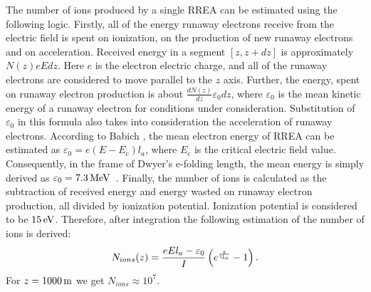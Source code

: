 \documentclass[doublecol,linenumbers]{epl2} %
\begin{document}
	The number of ions produced by a single RREA can be estimated using the following logic. Firstly, all of the energy runaway electrons receive from the electric field is spent on ionization, on the production of new runaway electrons and on acceleration. Received energy in a segment $[z, z + dz]$ is approximately $N(z) e E d z$. Here $e$ is the electron electric charge, and all of the runaway electrons are considered to move parallel to the $z$ axis. Further, the energy, spent on runaway electron production is about $\frac{d N(z)}{d z} \varepsilon_{0} d z$, where $\varepsilon_{0}$ is the mean kinetic energy of a runaway electron for conditions under consideration. Substitution of $\varepsilon_0$ in this formula also takes into consideration the acceleration of runaway electrons. According to Babich \cite{Babich2001}, the mean electron energy of RREA can be estimated as $\varepsilon_0 = e(E - E_c) l_a$, where $E_c$ is the critical electric field value. Consequently, in the frame of Dwyer's e-folding length, the mean energy is simply derived as $\varepsilon_0 = 7.3\un{MeV}$~\cite{Dwyer2007}. Finally, the number of ions is calculated as the subtraction of received energy and energy wasted on runaway electron production, all divided by ionization potential. Ionization potential is considered to be $15\un{eV}$. Therefore, after integration the following estimation of the number of ions is derived:
	\begin{equation}
		N_{ions}(z) = \frac{e E l_a - \varepsilon_0}{I} \left( e^{\frac{z}{\l_a}} - 1\right).
	\end{equation}
	For $z = 1000\un{m}$ we get $N_{ions} \approx 10^7$.
	
\end{document}
